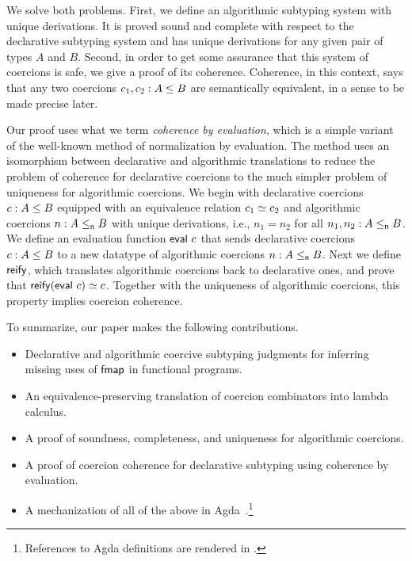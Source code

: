 \documentclass[acmsmall,screen]{acmart}
\begin{document}
We solve both problems. First, we define an algorithmic subtyping system with
unique derivations. It is proved sound and complete with respect to the
declarative subtyping system and has unique derivations for any given pair of
types \(A\) and \(B\).  Second, in order to get some assurance that this system
of coercions is safe, we give a proof of its coherence. Coherence, in this
context, says that any two coercions \(c_1, c_2 : A \leq B\) are semantically
equivalent, in a sense to be made precise later.

Our proof uses what we term \emph{coherence by evaluation}, which is a simple
variant of the well-known method of normalization by evaluation. 
The method uses an isomorphism between declarative and algorithmic translations
to reduce the problem of coherence for declarative coercions to the much simpler
problem of uniqueness for algorithmic coercions.
We begin with declarative coercions \(c : A \leq B\) equipped with an
equivalence relation \(c_1 \simeq c_2\) and algorithmic coercions \(n
: A \leq_{\mathsf{n}} B\) with unique derivations, i.e., \(n_1 = n_2\) for all \(n_1, n_2
: A \leq_{\mathsf{n}} B\). We define an evaluation function \(\mathsf{eval}\ c\) that sends
declarative coercions \(c : A \leq B\) to a new datatype of algorithmic
coercions \(n : A \leq_{\mathsf{n}} B\). Next we define \(\mathsf{reify}\), which translates
algorithmic coercions back to declarative ones, and prove that \(\mathsf{reify} (\mathsf{eval}\ c) \simeq c\). Together with the uniqueness of algorithmic coercions, this
property implies coercion coherence.

To summarize, our paper makes the following contributions.
\begin{itemize}
  \item Declarative and algorithmic coercive subtyping judgments for inferring missing uses of \(\mathsf{fmap}\) in functional programs.
  \item An equivalence-preserving translation of coercion combinators into lambda calculus.
  \item A proof of soundness, completeness, and uniqueness for algorithmic coercions.
  \item A proof of coercion coherence for declarative subtyping using coherence by evaluation.
  \item A mechanization of all of the above in Agda~\cite{hask-artifact}.\footnote{References to Agda definitions are rendered in .}
\end{itemize}
\end{document}

